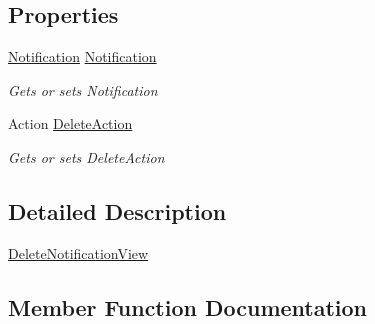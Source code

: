 \subsection*{Properties}
\begin{DoxyCompactItemize}
\item 
\mbox{\hyperlink{class_gtd_app_1_1_data_1_1_notification}{Notification}} \mbox{\hyperlink{class_gtd_app_1_1_console_1_1_views_1_1_notifications_1_1_delete_notification_view_a66a40261714509c44fa2acaafb0dc437}{Notification}}
\begin{DoxyCompactList}\small\item\em Gets or sets Notification \end{DoxyCompactList}\item 
Action \mbox{\hyperlink{class_gtd_app_1_1_console_1_1_views_1_1_notifications_1_1_delete_notification_view_a144e91a82d697678051939f4b2e17263}{Delete\+Action}}
\begin{DoxyCompactList}\small\item\em Gets or sets Delete\+Action \end{DoxyCompactList}\end{DoxyCompactItemize}


\subsection{Detailed Description}
\mbox{\hyperlink{class_gtd_app_1_1_console_1_1_views_1_1_notifications_1_1_delete_notification_view}{Delete\+Notification\+View}} 



\subsection{Member Function Documentation}
\mbox{\label{class_gtd_app_1_1_console_1_1_views_1_1_notifications_1_1_delete_notification_view_a8398329794538274a3761116a35c9d9f}} 
